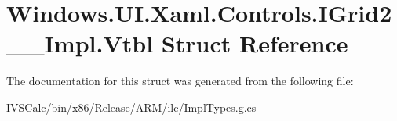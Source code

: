 \hypertarget{struct_windows_1_1_u_i_1_1_xaml_1_1_controls_1_1_i_grid2_____impl_1_1_vtbl}{}\section{Windows.\+U\+I.\+Xaml.\+Controls.\+I\+Grid2\+\_\+\+\_\+\+Impl.\+Vtbl Struct Reference}
\label{struct_windows_1_1_u_i_1_1_xaml_1_1_controls_1_1_i_grid2_____impl_1_1_vtbl}


The documentation for this struct was generated from the following file\+:\begin{DoxyCompactItemize}
\item 
I\+V\+S\+Calc/bin/x86/\+Release/\+A\+R\+M/ilc/Impl\+Types.\+g.\+cs\end{DoxyCompactItemize}
